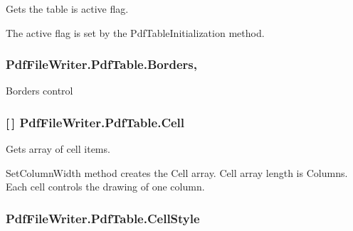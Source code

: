 Gets the table is active flag. 

The active flag is set by the Pdf\+Table\+Initialization method. 
\subsubsection[{\texorpdfstring{Borders}{Borders}}]{ Pdf\+File\+Writer.\+Pdf\+Table.\+Borders\hspace{0.3cm}{\ttfamily [get]}, {\ttfamily [set]}}\hypertarget{class_pdf_file_writer_1_1_pdf_table_abfa9274eb1da0c1e6de0d750502535b9}{}\label{class_pdf_file_writer_1_1_pdf_table_abfa9274eb1da0c1e6de0d750502535b9}


Borders control 

\subsubsection[{\texorpdfstring{Cell}{Cell}}]{ \mbox{[}$\,$\mbox{]} Pdf\+File\+Writer.\+Pdf\+Table.\+Cell\hspace{0.3cm}{\ttfamily [get]}}\hypertarget{class_pdf_file_writer_1_1_pdf_table_abdd6b3231379da7acad123908813622b}{}\label{class_pdf_file_writer_1_1_pdf_table_abdd6b3231379da7acad123908813622b}


Gets array of cell items. 

Set\+Column\+Width method creates the Cell array. Cell array length is Columns. Each cell controls the drawing of one column. 
\subsubsection[{\texorpdfstring{Cell\+Style}{CellStyle}}]{ Pdf\+File\+Writer.\+Pdf\+Table.\+Cell\+Style\hspace{0.3cm}{\ttfamily [get]}}\hypertarget{class_pdf_file_writer_1_1_pdf_table_a030631b4e73051bcd9c0d07818b1e934}{}\label{class_pdf_file_writer_1_1_pdf_table_a030631b4e73051bcd9c0d07818b1e934}


